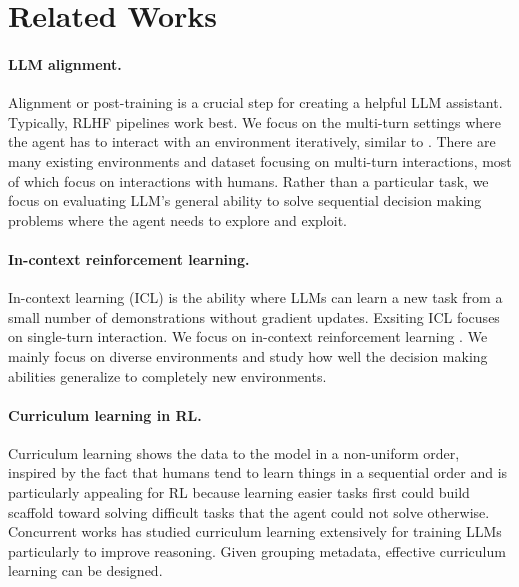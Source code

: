 \documentclass[manuscript,review]{acmart}
\begin{document}
\section{Related Works}
{
\paragraph{LLM alignment.} { 
Alignment or post-training is a crucial step for creating a helpful LLM assistant.
Typically, RLHF pipelines\cite{christiano2017deep} work best. We focus on the multi-turn settings
where the agent has to interact with an environment iteratively, similar to
\cite{rafailov2024rqlanguagemodel}. There are many existing environments and
dataset focusing on multi-turn interactions, most of which focus on interactions 
with humans. Rather than a particular task, we focus on evaluating LLM's general
ability to solve sequential decision making problems where the agent needs to 
explore and exploit.
}

\paragraph{In-context reinforcement learning.}{
In-context learning (ICL) is the ability where LLMs can learn a new task from a small
number of demonstrations without gradient updates\cite{brown2020language}. Exsiting
ICL focuses on single-turn interaction. We focus on in-context reinforcement learning
\citep{laskin2022context, raparthy2023generalization, lee2024supervised, lin2024transformers}.
We mainly focus on diverse environments and study how well the decision making abilities
generalize to completely new environments.
}

\paragraph{Curriculum learning in RL.} {
Curriculum learning\cite{bengio2009curriculum} shows the data to the model in a 
non-uniform order, inspired by the fact that humans tend to learn things in a 
sequential order\cite{skinner1958reinforcement} and is particularly appealing for 
RL because learning easier tasks first could build scaffold toward solving difficult
tasks that the agent could not solve otherwise\cite{andrychowicz2017hindsight,florensa2017reverse,fang2019curriculum}.
Concurrent works\cite{foster2025learningreasonfrontierlearnability} has studied
curriculum learning extensively for training LLMs particularly to improve reasoning.
Given grouping metadata, effective curriculum learning can be designed.
}

}
\end{document}

